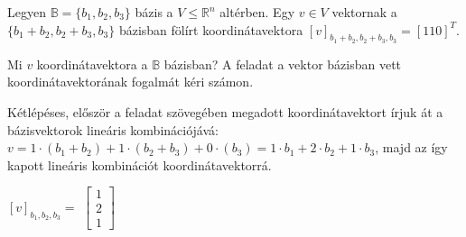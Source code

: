 \begin{frame}
  \begin{tcolorbox}[title={1/2. {\symrook}}]
      Legyen $\mathbb{B} = \{b_1,b_2,b_3\}$ bázis a $V \leq \mathbb{R}^n$ altérben. Egy $v \in V$ vektornak a $\{b_1 + b_2,b_2 + b_3,b_3\}$ bázisban fölírt koordinátavektora $[v]_{b_1+b_2,b_2+b_3,b_3} = [1 1 0]^T$.\\
      \mmedskip
      
      Mi $v$ koordinátavektora a $\mathbb{B}$ bázisban?
  \tcblower
    A feladat a vektor bázisban vett koordinátavektorának fogalmát kéri számon.\\
    \mmedskip
   
    Kétlépéses, először a feladat szövegében megadott koordinátavektort írjuk át a bázisvektorok lineáris kombinációjává: $v = 1 \cdot (b_1 + b_2) + 1 \cdot (b_2 + b_3) + 0 \cdot (b_3) = 1 \cdot b_1 + 2 \cdot b_2 + 1 \cdot b_3$, majd az így kapott lineáris kombinációt koordinátavektorrá.\\
     \mmedskip
     
   $[v]_{b_1,b_2,b_3} =$ $\begin{bmatrix} 
  				1  \\
  				2 \\
  				1
			\end{bmatrix}$
  \end{tcolorbox}
\end{frame}

